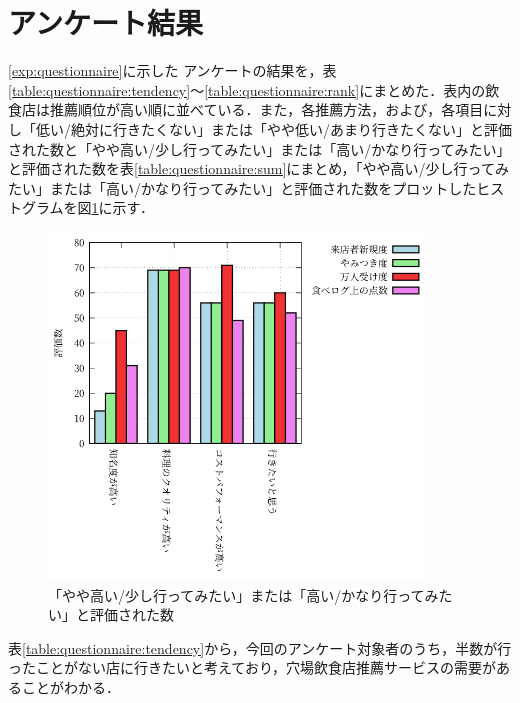 	\section{アンケート結果}
	\ref{exp:questionnaire}に示した
	アンケートの結果を，表\ref{table:questionnaire:tendency}〜\ref{table:questionnaire:rank}にまとめた．表内の飲食店は推薦順位が高い順に並べている．また，各推薦方法，および，各項目に対し「低い/絶対に行きたくない」または「やや低い/あまり行きたくない」と評価された数と「やや高い/少し行ってみたい」または「高い/かなり行ってみたい」と評価された数を表\ref{table:questionnaire:sum}にまとめ，「やや高い/少し行ってみたい」または「高い/かなり行ってみたい」と評価された数をプロットしたヒストグラムを図\ref{fig:sum}に示す．
	
	
	
	
	
	
	
	\begin{figure}[H]
		\centering
		\includegraphics[width=10cm]{./figure/sum.png}
		\caption{「やや高い/少し行ってみたい」または「高い/かなり行ってみたい」と評価された数\label{fig:sum}}
	\end{figure}
	\par
	表\ref{table:questionnaire:tendency}から，今回のアンケート対象者のうち，半数が行ったことがない店に行きたいと考えており，穴場飲食店推薦サービスの需要があることがわかる．\par
